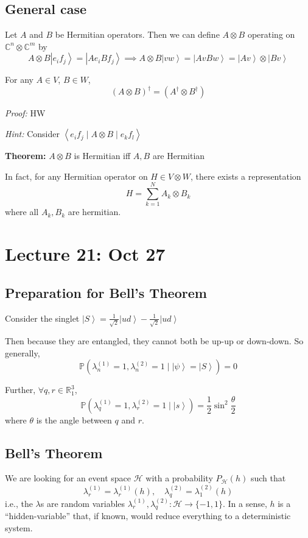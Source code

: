 \documentclass[12pt]{article}
\renewcommand{\P}{\mathbb{P}}
\newcommand{\R}{\mathbb{R}}
\newcommand{\brak}[1]{\left\langle #1 \right\rangle}
\newcommand{\C}{\mathbb{C}}
\newcommand{\ket}[1]{\left\vert #1 \right\rangle}
\begin{document}
\subsection*{General case}
    Let $A$ and $B$ be Hermitian operators. Then we can define $A \otimes B$ operating on $\C^n \otimes \C^m$ by 
    \[A \otimes B \ket{e_i f_j} = \ket{Ae_i Bf_j} \implies A\otimes B\ket{vw} = \ket{AvBw} = \ket{Av}\otimes \ket{Bv}\]

    For any $A \in V$, $B \in W$, 
    \[(A \otimes B)^\dagger = (A^\dagger \otimes B^\dagger)\]

    \emph{Proof:} HW

    \emph{Hint:} Consider $\brak{e_i f_j \; | \; A\otimes B \; | \;e_k f_l}$

    \textbf{Theorem:} $A \otimes B$ is Hermitian iff $A, B$ are Hermitian

    In fact, for any Hermitian operator on $H \in V\otimes W$, there exists a representation 
    \[H = \sum_{k=1}^N A_k \otimes B_k\]
    where all $A_k, B_k$ are hermitian. 

\section*{Lecture 21: Oct 27}
    \subsection*{Preparation for Bell's Theorem}
        Consider the singlet $\ket S = \frac{1}{\sqrt 2} \ket{ud} - \frac{1}{\sqrt 2}\ket{ud}$

        Then because they are entangled, they cannot both be up-up or down-down. So generally, 
        \[\P(\lambda_n^{(1)} = 1, \lambda_n^{(2)} = 1 \; | \; \ket{\psi} = \ket S) = 0\]
        
        Further, $\forall q, r \in \R_1^3$, 
        \[\P(\lambda_q^{(1)} = 1, \lambda_r^{(2)} = 1 \; | \; \ket{s}) = \frac{1}{2}\sin^2 \frac{\theta}{2}\]
        where $\theta$ is the angle between $q$ and $r$. 

    \subsection*{Bell's Theorem}
        We are looking for an event space $\mathcal{H}$ with a probability $P_{\mathcal{H}}(h)$ such that 
        \[\lambda_r^{(1)} = \lambda_r^{(1)}(h), \quad \lambda_q^{(2)} = \lambda_1^{(2)}(h)\]
        i.e., the $\lambda$s are random variables $\lambda^{(1)}_r, \lambda^{(2)}_q: \mathcal{H} \to \{-1, 1\}$. In a sense, $h$ is a ``hidden-variable'' that, if known, would reduce everything to a deterministic system. 
\end{document}
